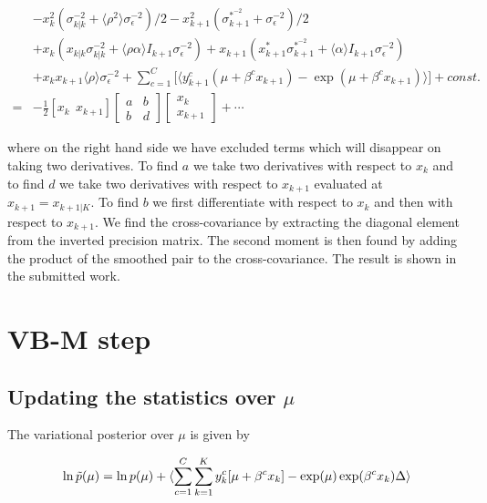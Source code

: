 \documentclass{article}
\begin{document}
\begin{equation*}
\begin{split}
& -x_k^2(\sigma^{-2}_{k|k} + \langle \rho^2 \rangle \sigma^{-2}_\epsilon)/2 - x_{k+1}^2(\sigma^{*^{-2}}_{k+1} + \sigma^{-2}_\epsilon)/2 \\
& + x_k(x_{k|k}\sigma^{-2}_{k|k} + \langle \rho \alpha \rangle I_{k+1}\sigma^{-2}_\epsilon) + x_{k+1}(x_{k+1}^*\sigma^{*^{-2}}_{k+1} + \langle \alpha \rangle I_{k+1}\sigma^{-2}_\epsilon) \\
&  + x_kx_{k+1}\langle \rho \rangle \sigma^{-2}_\epsilon + \sum_{c=1}^C\bigg[\langle y_{k+1}^c(\mu + \beta^cx_{k+1}) - \exp(\mu + \beta^cx_{k+1}) \rangle \bigg] + const. \\
=& -\frac{1}{2}[x_k~~x_{k+1}]\left[\begin{array}{cc} a & b \\ b & d\end{array} \right]\left[ \begin{array}{c} x_k\\ x_{k+1} \end{array}\right] + \cdots
\end{split}
\end{equation*}

where on the right hand side we have excluded terms which will disappear on taking two derivatives. To find $a$ we take two derivatives with respect to $x_k$ and to find $d$ we take two derivatives with respect to $x_{k+1}$ evaluated at $x_{k+1} = x_{k+1 | K}$. To find $b$ we first differentiate with respect to $x_k$ and then with respect to $x_{k+1}$. We find the cross-covariance by extracting the diagonal element from the inverted precision matrix. The second moment is then found by adding the product of the smoothed pair to the cross-covariance. The result is shown in the submitted work.

\section{VB-M step}

\subsection{Updating the statistics over $\mu$}

The variational posterior over $\mu$ is given by

\begin{equation*}
\ln \tilde{p}(\mu) = \ln p(\mu) + \langle \sum_{c = 1}^C \sum_{k=1}^K y^c_k[\mu + \beta^c x_k] - \exp(\mu)\exp(\beta^cx_k)\Delta \rangle
\end{equation*}
\end{document}
